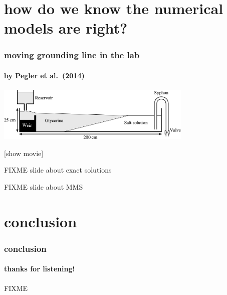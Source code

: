 \documentclass{beamer}
\begin{document}
\section[on being right]{how do we know the numerical models are right?}

\begin{frame}
  \frametitle{moving grounding line in the lab}
  \framesubtitle{by Pegler et al.~(2014)}

\begin{center}

\includegraphics[width=0.7\textwidth]{pegler2014-grounding-line-schematic}

\vspace{1.0in}
[show movie]
\end{center}
\end{frame}


\begin{frame}{FIXME slide about exact solutions}
\end{frame}


\begin{frame}{FIXME slide about MMS}
\end{frame}


\section*{conclusion}

\begin{frame}
  \frametitle{conclusion}
  \framesubtitle{thanks for listening!}

\begin{center}
FIXME
\end{center}

\end{frame}
\end{document}
